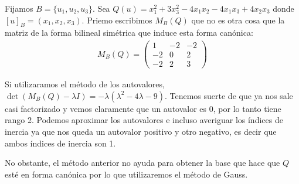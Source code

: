 \documentclass[14pt]{book}
\begin{document}
\begin{ej}
	Fijamos $B =  \{u_1, u_2, u_3\}$. Sea $Q(u) = x_1^2 + 3x_3^2 - 4x_1x_2 - 4x_1x_3 + 4x_2x_3$ donde $[u]_B = (x_1, x_2, x_3)$. Priemo escribimos $M_B(Q)$ que no es otra cosa que la matriz de la forma bilineal simétrica que induce esta forma canónica:
	\begin{align*}
		M_B(Q) = \left(\begin{array}{ccc}
		1 & -2 & -2 \\
		-2 & 0 & 2 \\
		-2 & 2 & 3
		\end{array}\right)
	\end{align*}
	
	Si utilizaramos el método de los autovalores, $\det(M_B(Q) - \lambda I) = -\lambda(\lambda^2 - 4\lambda - 9)$. Tenemos suerte de que ya nos sale casi factorizado y vemos claramente que un autovalor es $0$, por lo tanto tiene rango 2. Podemos aproximar los autovalores e incluso averiguar los índices de inercia ya que nos queda un autovalor positivo y otro negativo, es decir que ambos índices de inercia son 1.
	
	No obstante, el método anterior no ayuda para obtener la base que hace que $Q$ esté en forma canónica por lo que utilizaremos el método de Gauss.
	

\end{ej}
\end{document}
